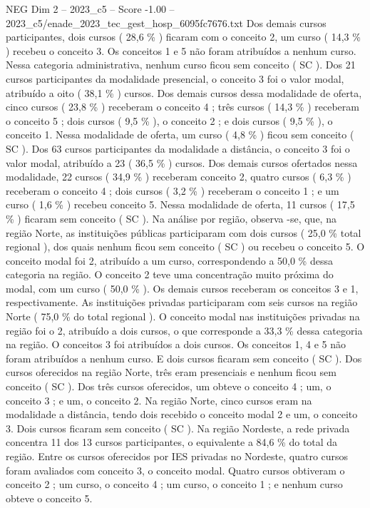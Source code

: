 \begin{textsample}{NEG Dim 2 – 2023\_c5 – Score -1.00 – 2023\_c5/enade\_2023\_tec\_gest\_hosp\_6095fc7676.txt}
Dos demais cursos participantes, dois cursos ( 28,6 \% ) ficaram com o conceito 2, um curso ( 14,3 \% ) recebeu o conceito 3.
Os conceitos 1 e 5 não foram atribuídos a nenhum curso.
Nessa categoria administrativa, nenhum curso ficou sem conceito ( SC ).
Dos 21 cursos participantes da modalidade presencial, o conceito 3 foi o valor modal, atribuído a oito ( 38,1 \% ) cursos.
Dos demais cursos dessa modalidade de oferta, cinco cursos ( 23,8 \% ) receberam o conceito 4 ; três cursos ( 14,3 \% ) receberam o conceito 5 ; dois cursos ( 9,5 \% ), o conceito 2 ; e dois cursos ( 9,5 \% ), o conceito 1.
Nessa modalidade de oferta, um curso ( 4,8 \% ) ficou sem conceito ( SC ).
Dos 63 cursos participantes da modalidade a distância, o conceito 3 foi o valor modal, atribuído a 23 ( 36,5 \% ) cursos.
Dos demais cursos ofertados nessa modalidade, 22 cursos ( 34,9 \% ) receberam conceito 2, quatro cursos ( 6,3 \% ) receberam o conceito 4 ; dois cursos ( 3,2 \% ) receberam o conceito 1 ; e um curso ( 1,6 \% ) recebeu conceito 5.
Nessa modalidade de oferta, 11 cursos ( 17,5 \% ) ficaram sem conceito ( SC ).
Na análise por região, observa -se, que, na região Norte, as instituições públicas participaram com dois cursos ( 25,0 \% total regional ), dos quais nenhum ficou sem conceito ( SC ) ou recebeu o conceito 5.
O conceito modal foi 2, atribuído a um curso, correspondendo a 50,0 \% dessa categoria na região.
O conceito 2 teve uma concentração muito próxima do modal, com um curso ( 50,0 \% ).
Os demais cursos receberam os conceitos 3 e 1, respectivamente.
As instituições privadas participaram com seis cursos na região Norte ( 75,0 \% do total regional ).
O conceito modal nas instituições privadas na região foi o 2, atribuído a dois cursos, o que corresponde a 33,3 \% dessa categoria na região.
O conceitos 3 foi atribuídos a dois cursos.
Os conceitos 1, 4 e 5 não foram atribuídos a nenhum curso.
E dois cursos ficaram sem conceito ( SC ).
Dos cursos oferecidos na região Norte, três eram presenciais e nenhum ficou sem conceito ( SC ).
Dos três cursos oferecidos, um obteve o conceito 4 ; um, o conceito 3 ; e um, o conceito 2.
Na região Norte, cinco cursos eram na modalidade a distância, tendo dois recebido o conceito modal 2 e um, o conceito 3.
Dois cursos ficaram sem conceito ( SC ).
Na região Nordeste, a rede privada concentra 11 dos 13 cursos participantes, o equivalente a 84,6 \% do total da região.
Entre os cursos oferecidos por IES privadas no Nordeste, quatro cursos foram avaliados com conceito 3, o conceito modal.
Quatro cursos obtiveram o conceito 2 ; um curso, o conceito 4 ; um curso, o conceito 1 ; e nenhum curso obteve o conceito 5.

\end{textsample}

